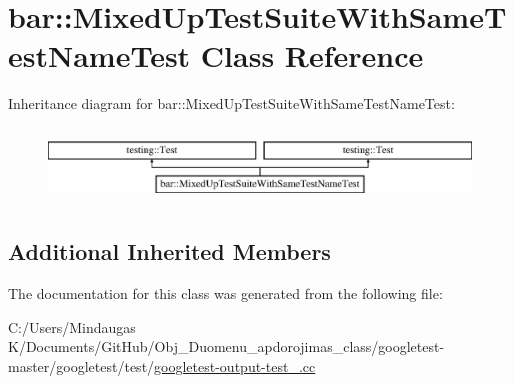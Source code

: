 \hypertarget{classbar_1_1_mixed_up_test_suite_with_same_test_name_test}{}\section{bar\+::Mixed\+Up\+Test\+Suite\+With\+Same\+Test\+Name\+Test Class Reference}
\label{classbar_1_1_mixed_up_test_suite_with_same_test_name_test}
Inheritance diagram for bar\+::Mixed\+Up\+Test\+Suite\+With\+Same\+Test\+Name\+Test\+:\begin{figure}[H]
\begin{center}
\leavevmode
\includegraphics[height=2.000000cm]{d8/d36/classbar_1_1_mixed_up_test_suite_with_same_test_name_test}
\end{center}
\end{figure}
\subsection*{Additional Inherited Members}


The documentation for this class was generated from the following file\+:\begin{DoxyCompactItemize}
\item 
C\+:/\+Users/\+Mindaugas K/\+Documents/\+Git\+Hub/\+Obj\+\_\+\+Duomenu\+\_\+apdorojimas\+\_\+class/googletest-\/master/googletest/test/\mbox{\hyperlink{googletest-master_2googletest_2test_2googletest-output-test___8cc}{googletest-\/output-\/test\+\_\+.\+cc}}\end{DoxyCompactItemize}
